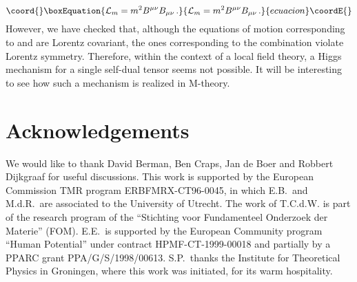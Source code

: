 \documentclass[12pt,a4paper]{article}
\begin{document}
\begin{equation}\coord{}\boxEquation{
{\cal L}_m = m^2 B^{\mu\nu} B_{\mu\nu}\,.
}{
{\cal L}_m = m^2 B^{\mu\nu} B_{\mu\nu}\,.
}{ecuacion}\coordE{}\end{equation}
However, we have checked that, although the equations of motion corresponding
to \coordHE{} and \coordHE{} are Lorentz covariant, the ones
corresponding to the combination \coordHE{} violate
Lorentz symmetry. Therefore, within the context of a local field theory,
a Higgs mechanism for a single self-dual tensor seems not possible.
It will be interesting to see how such a mechanism is realized
in M-theory.


\section{Acknowledgements}

We would like to thank David Berman, Ben Craps, Jan de Boer and
 Robbert Dijkgraaf
 for useful discussions.  This work is supported by the European
 Commission TMR program ERBFMRX-CT96-0045, in which E.B.~and M.d.R.~are
 associated to the University of Utrecht. The work of T.C.d.W. is part of
 the research program of the ``Stichting voor Fundamenteel Onderzoek der
 Materie'' (FOM). E.E.\ is supported by the European Community program
 ``Human Potential'' under contract HPMF-CT-1999-00018 and partially
 by a PPARC grant PPA/G/S/1998/00613. S.P.\ thanks the Institute for
 Theoretical Physics in Groningen, where this work was initiated,
 for its warm hospitality.
\end{document}
